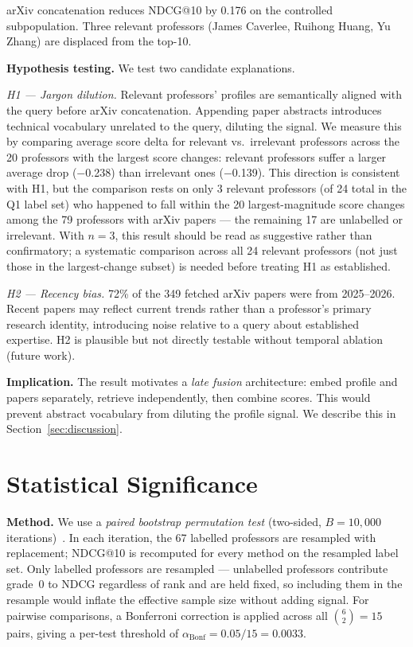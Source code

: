 \documentclass[11pt,a4paper]{article}
\begin{document}
arXiv concatenation reduces NDCG@10 by 0.176 on the controlled
subpopulation. Three relevant professors (James Caverlee,
Ruihong Huang, Yu Zhang) are displaced from the top-10.

\textbf{Hypothesis testing.}
We test two candidate explanations.

\textit{H1 --- Jargon dilution.}
Relevant professors' profiles are semantically aligned with the query
before arXiv concatenation. Appending paper abstracts introduces
technical vocabulary unrelated to the query, diluting the signal.
We measure this by comparing average score delta for relevant vs.\
irrelevant professors across the 20 professors with the largest score
changes: relevant professors suffer a larger average drop
($-$0.238) than irrelevant ones ($-$0.139).
This direction is consistent with H1, but the comparison rests on only
3 relevant professors (of 24 total in the Q1 label set) who happened to
fall within the 20 largest-magnitude score changes among the 79
professors with arXiv papers --- the remaining 17 are unlabelled or
irrelevant. With $n=3$, this result should be read as suggestive rather
than confirmatory; a systematic comparison across all 24 relevant
professors (not just those in the largest-change subset) is needed
before treating H1 as established.

\textit{H2 --- Recency bias.}
72\% of the 349 fetched arXiv papers were from 2025--2026.
Recent papers may reflect current trends rather than a professor's
primary research identity, introducing noise relative to a query
about established expertise. H2 is plausible but not
directly testable without temporal ablation (future work).

\textbf{Implication.}
The result motivates a \emph{late fusion} architecture: embed profile
and papers separately, retrieve independently, then combine scores.
This would prevent abstract vocabulary from diluting the profile signal.
We describe this in Section~\ref{sec:discussion}.

\section{Statistical Significance}
\label{sec:significance}

\textbf{Method.} We use a \emph{paired bootstrap permutation test}
(two-sided, $B = 10{,}000$ iterations)~\cite{efron1993bootstrap}.
In each iteration, the 67 labelled professors are resampled with
replacement; NDCG@10 is recomputed for every method on the resampled
label set. Only labelled professors are resampled --- unlabelled
professors contribute grade~0 to NDCG regardless of rank and are held
fixed, so including them in the resample would inflate the effective
sample size without adding signal.
For pairwise comparisons, a Bonferroni correction is applied across
all $\binom{6}{2} = 15$ pairs, giving a per-test threshold of
$\alpha_{\text{Bonf}} = 0.05 / 15 = 0.0033$.
\end{document}
